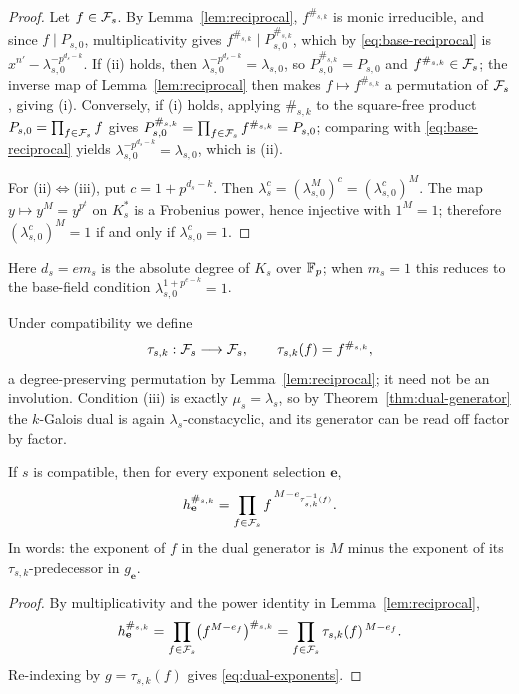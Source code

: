 \begin{proof}
Let $f\in\mathcal F_s$.  By Lemma~\ref{lem:reciprocal}, $f^{\#_{s,k}}$ is monic
irreducible, and since $f\mid P_{s,0}$, multiplicativity gives
$f^{\#_{s,k}}\mid P_{s,0}^{\#_{s,k}}$, which by \eqref{eq:base-reciprocal} is
$x^{n'}-\lambda_{s,0}^{-p^{d_s-k}}$.  If (ii) holds, then
$\lambda_{s,0}^{-p^{d_s-k}}=\lambda_{s,0}$, so
$P_{s,0}^{\#_{s,k}}=P_{s,0}$ and $f^{\#_{s,k}}\in\mathcal F_s$; the inverse map of
Lemma~\ref{lem:reciprocal} then makes $f\mapsto f^{\#_{s,k}}$ a permutation of
$\mathcal F_s$, giving (i).  Conversely, if (i) holds, applying $\#_{s,k}$ to the
square-free product $P_{s,0}=\prod_{f\in\mathcal F_s}f$ gives
$P_{s,0}^{\#_{s,k}}=\prod_{f\in\mathcal F_s}f^{\#_{s,k}}=P_{s,0}$; comparing with
\eqref{eq:base-reciprocal} yields
$\lambda_{s,0}^{-p^{d_s-k}}=\lambda_{s,0}$, which is (ii).

For (ii)$\Leftrightarrow$(iii), put $c=1+p^{d_s-k}$.  Then
$\lambda_s^c=(\lambda_{s,0}^M)^c=(\lambda_{s,0}^c)^M$.  The map
$y\mapsto y^M=y^{p^t}$ on $K_s^\ast$ is a Frobenius power, hence injective with
$1^M=1$; therefore $(\lambda_{s,0}^c)^M=1$ if and only if
$\lambda_{s,0}^c=1$.
\end{proof}

Here $d_s=em_s$ is the absolute degree of $K_s$ over $\mathbb F_p$; when $m_s=1$ this
reduces to the base-field condition $\lambda_{s,0}^{1+p^{e-k}}=1$.

Under compatibility we define
\[
\tau_{s,k}:\mathcal F_s\longrightarrow\mathcal F_s,\qquad \tau_{s,k}(f)=f^{\#_{s,k}},
\]
a degree-preserving permutation by Lemma~\ref{lem:reciprocal}; it need not be
an involution.  Condition (iii) is exactly $\mu_s=\lambda_s$, so by
Theorem~\ref{thm:dual-generator} the $k$-Galois dual is again
$\lambda_s$-constacyclic, and its generator can be read off factor by factor.

\begin{proposition}\label{prop:dual-exponents}
If $s$ is compatible, then for every exponent selection $\mathbf{e}$,
\begin{equation}\label{eq:dual-exponents}
h_{\mathbf{e}}^{\#_{s,k}}
   =\prod_{f\in\mathcal F_s} f^{\,M-e_{\tau_{s,k}^{-1}(f)}}.
\end{equation}
In words: the exponent of $f$ in the dual generator is $M$ minus the exponent
of its $\tau_{s,k}$-predecessor in $g_{\mathbf{e}}$.
\end{proposition}

\begin{proof}
By multiplicativity and the power identity in Lemma~\ref{lem:reciprocal},
\[
h_{\mathbf{e}}^{\#_{s,k}}
 =\prod_{f\in\mathcal F_s}\bigl(f^{M-e_f}\bigr)^{\#_{s,k}}
 =\prod_{f\in\mathcal F_s}\tau_{s,k}(f)^{\,M-e_f}.
\]
Re-indexing by $g=\tau_{s,k}(f)$ gives \eqref{eq:dual-exponents}.
\end{proof}


